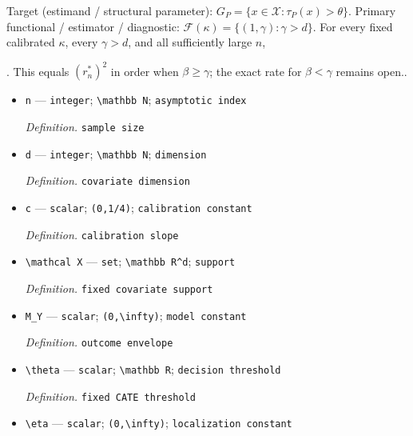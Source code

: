 \documentclass{article}
\begin{document}
Target (estimand / structural parameter): \(G_P=\{x\in\mathcal X:\tau_P(x)>\theta\}\).
Primary functional / estimator / diagnostic: \(\mathcal F(\kappa)=\{(1,\gamma):\gamma>d\}\). For every fixed calibrated \(\kappa\), every \(\gamma>d\), and all sufficiently large \(n\), \leavevmode\par\noindent {}\par\noindent. This equals \((r_n^*)^2\) in order when \(\beta\ge\gamma\); the exact rate for \(\beta<\gamma\) remains open..
\begin{itemize}
  \item \texttt{n} --- \texttt{integer}; \texttt{\textbackslash{}\allowbreak{}mathbb N}; \texttt{asymptotic index}
  \par\smallskip\noindent\emph{Definition.} \texttt{sample size}
  \item \texttt{d} --- \texttt{integer}; \texttt{\textbackslash{}\allowbreak{}mathbb N}; \texttt{dimension}
  \par\smallskip\noindent\emph{Definition.} \texttt{covariate dimension}
  \item \texttt{c} --- \texttt{scalar}; \texttt{(0,\allowbreak{}1/\allowbreak{}4)}; \texttt{calibration constant}
  \par\smallskip\noindent\emph{Definition.} \texttt{calibration slope}
  \item \texttt{\textbackslash{}\allowbreak{}mathcal X} --- \texttt{set}; \texttt{\textbackslash{}\allowbreak{}mathbb R\textasciicircum{}d}; \texttt{support}
  \par\smallskip\noindent\emph{Definition.} \texttt{fixed covariate support}
  \item \texttt{M\_\allowbreak{}Y} --- \texttt{scalar}; \texttt{(0,\allowbreak{}\textbackslash{}\allowbreak{}infty)}; \texttt{model constant}
  \par\smallskip\noindent\emph{Definition.} \texttt{outcome envelope}
  \item \texttt{\textbackslash{}\allowbreak{}theta} --- \texttt{scalar}; \texttt{\textbackslash{}\allowbreak{}mathbb R}; \texttt{decision threshold}
  \par\smallskip\noindent\emph{Definition.} \texttt{fixed CATE threshold}
  \item \texttt{\textbackslash{}\allowbreak{}eta} --- \texttt{scalar}; \texttt{(0,\allowbreak{}\textbackslash{}\allowbreak{}infty)}; \texttt{localization constant}

\end{itemize}
\end{document}
